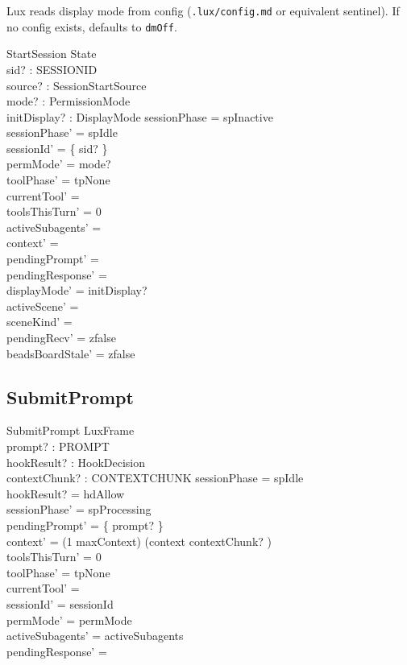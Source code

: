 \documentclass[a4paper,10pt,fleqn]{article}
\begin{document}
Lux reads display mode from config (\texttt{.lux/config.md} or
equivalent sentinel). If no config exists, defaults to \texttt{dmOff}.

\begin{schema}{StartSession}
  \Delta State \\
  sid? : SESSIONID \\
  source? : SessionStartSource \\
  mode? : PermissionMode \\
  initDisplay? : DisplayMode
  \where
  sessionPhase = spInactive \\
  sessionPhase' = spIdle \\
  sessionId' = \{ sid? \} \\
  permMode' = mode? \\
  toolPhase' = tpNone \\
  currentTool' = \emptyset \\
  toolsThisTurn' = 0 \\
  activeSubagents' = \emptyset \\
  context' = \langle \rangle \\
  pendingPrompt' = \emptyset \\
  pendingResponse' = \emptyset \\
  displayMode' = initDisplay? \\
  activeScene' = \emptyset \\
  sceneKind' = \emptyset \\
  pendingRecv' = zfalse \\
  beadsBoardStale' = zfalse
\end{schema}

\subsection{SubmitPrompt}

\begin{schema}{SubmitPrompt}
  LuxFrame \\
  prompt? : PROMPT \\
  hookResult? : HookDecision \\
  contextChunk? : CONTEXTCHUNK
  \where
  sessionPhase = spIdle \\
  hookResult? = hdAllow \\
  sessionPhase' = spProcessing \\
  pendingPrompt' = \{ prompt? \} \\
  context' = (1 \upto maxContext) \dres (context \cat \langle contextChunk? \rangle) \\
  toolsThisTurn' = 0 \\
  toolPhase' = tpNone \\
  currentTool' = \emptyset \\
  sessionId' = sessionId \\
  permMode' = permMode \\
  activeSubagents' = activeSubagents \\
  pendingResponse' = \emptyset
\end{schema}
\end{document}
